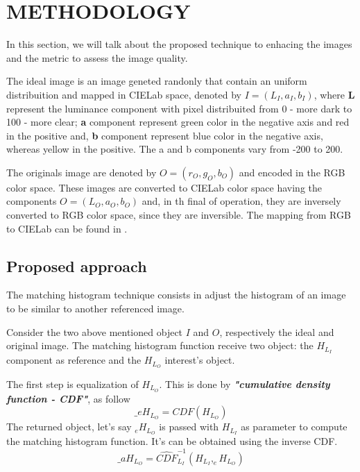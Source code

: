 \documentclass{article}
\begin{document}
    
    \section{METHODOLOGY}
    \label{sec:meth}
    In this section, we will talk about the proposed technique to enhacing the images and the metric to assess the image quality.
    
    The ideal image is an image geneted randonly that contain an uniform distribuition and mapped in CIELab space, denoted by $I=(L_I,a_I,b_I)$, where \textbf{L} represent the luminance component with pixel distribuited from 0 - more dark to 100 - more clear; \textbf{a} component represent green color in the negative axis and red in the positive and, \textbf{b} component represent blue color in the negative axis, whereas yellow in the positive. The a and b components vary from -200 to 200.
    
    The originals image are denoted by $O=(r_O, g_O, b_O)$ and encoded in the RGB color space. These images are converted to CIELab color space having the components $O=(L_O, a_O, b_O)$ and, in th final of operation, they are inversely converted to RGB color space, since they are inversible. The mapping from RGB to CIELab can be found in \citep{AssessingInformationContentinColorImages}. 
    
    \subsection{Proposed approach}
    The matching histogram technique consists in adjust the histogram of an image to be similar to another referenced image.
    
    Consider the two above mentioned object $I$ and $O$, respectively the ideal and original image. The matching histogram function receive two object: the $H_{L_I}$ component as reference and the $H_{L_O}$ interest's object. 

    The first step is equalization of $H_{L_O}$. This is done by \textbf{\textit{"cumulative density function - CDF"}}, as follow
    \begin{equation}
        \bm _eH_{L_O} = CDF(H_{L_O})
    \end{equation}
    The returned object, let's say $_eH_{L_O}$ is passed with $H_{L_I}$ as parameter to compute the matching histogram function. It's can be obtained using the inverse CDF.
    \begin{equation}
        \bm _aH_{L_O} = \widehat{CDF}_{L_I}^{-1}(H_{L_I}, _eH_{L_O})
        \label{inv:cdf}
    \end{equation}
    
\end{document}
